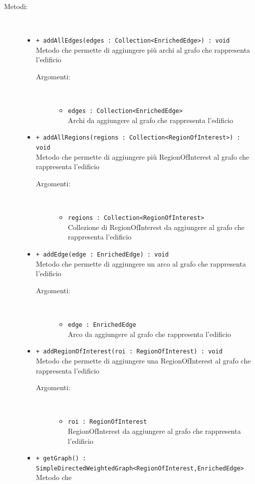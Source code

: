 \documentclass[../DefinizioneDiProdotto.tex]{subfiles}
\begin{document}
\begin{description}
\begin{itemize}
\end{itemize}
\item[Metodi:] \
\begin{itemize}
\item \texttt{+ addAllEdges(edges : Collection<EnrichedEdge>) : void}\\
Metodo che permette di aggiungere più archi al grafo che rappresenta l'edificio
 \begin{description}
\item[Argomenti:] \
\begin{itemize}
\item \texttt{edges : Collection<EnrichedEdge>}\\
Archi da aggiungere al grafo che rappresenta l'edificio\end{itemize}
\end{description}
\item \texttt{+ addAllRegions(regions : Collection<RegionOfInterest>) : void}\\
Metodo che permette di aggiungere più RegionOfInterest al grafo che rappresenta l'edificio
 \begin{description}
\item[Argomenti:] \
\begin{itemize}
\item \texttt{regions : Collection<RegionOfInterest>}\\
Collezione di RegionOfInterest da aggiungere al grafo che rappresenta l'edificio\end{itemize}
\end{description}
\item \texttt{+ addEdge(edge : EnrichedEdge) : void}\\
Metodo che permette di aggiungere un arco al grafo che rappresenta l'edificio
 \begin{description}
\item[Argomenti:] \
\begin{itemize}
\item \texttt{edge : EnrichedEdge}\\
Arco da aggiungere al grafo che rappresenta l'edificio\end{itemize}
\end{description}
\item \texttt{+ addRegionOfInterest(roi : RegionOfInterest) : void}\\
Metodo che permette di aggiungere una RegionOfInterest al grafo che rappresenta l'edificio
 \begin{description}
\item[Argomenti:] \
\begin{itemize}
\item \texttt{roi : RegionOfInterest}\\
RegionOfInterest da aggiungere al grafo che rappresenta l'edificio\end{itemize}
\end{description}
\item \texttt{+ getGraph() : SimpleDirectedWeightedGraph<RegionOfInterest,EnrichedEdge>}\\
Metodo che
 \end{itemize}
\end{description}
\end{document}
